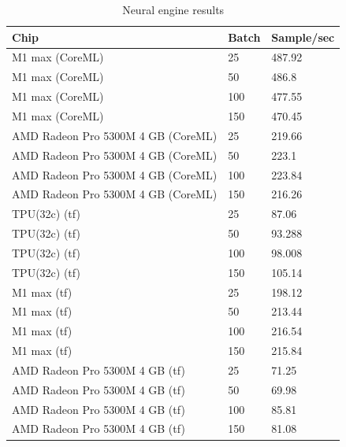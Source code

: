 \documentclass[11pt]{article}
\begin{document}
\begin{table}[!ht]
    \centering
    \begin{tabular}{|l|l|l|}
    \hline
        Chip & Batch & Sample/sec  \\ \hline
        M1 max (CoreML) & 25 & 487.92  \\ \hline
        M1 max (CoreML) & 50 & 486.8  \\ \hline
        M1 max (CoreML) & 100 & 477.55  \\ \hline
        M1 max (CoreML) & 150 & 470.45  \\ \hline
        AMD Radeon Pro 5300M 4 GB (CoreML) & 25 & 219.66  \\ \hline
        AMD Radeon Pro 5300M 4 GB (CoreML) & 50 & 223.1  \\ \hline
        AMD Radeon Pro 5300M 4 GB (CoreML) & 100 & 223.84  \\ \hline
        AMD Radeon Pro 5300M 4 GB (CoreML) & 150 & 216.26  \\ \hline
        TPU(32c) (tf) & 25 & 87.06  \\ \hline
        TPU(32c) (tf) & 50 & 93.288  \\ \hline
        TPU(32c) (tf) & 100 & 98.008  \\ \hline
        TPU(32c) (tf) & 150 & 105.14  \\ \hline
        M1 max (tf) & 25 & 198.12  \\ \hline
        M1 max (tf) & 50 & 213.44  \\ \hline
        M1 max (tf) & 100 & 216.54  \\ \hline
        M1 max (tf) & 150 & 215.84  \\ \hline
        AMD Radeon Pro 5300M 4 GB (tf) & 25 & 71.25  \\ \hline
        AMD Radeon Pro 5300M 4 GB (tf) & 50 & 69.98  \\ \hline
        AMD Radeon Pro 5300M 4 GB (tf) & 100 & 85.81  \\ \hline
        AMD Radeon Pro 5300M 4 GB (tf) & 150 & 81.08 \\ \hline
    \end{tabular}
    \caption{Neural engine results}
\end{table}
\end{document}
